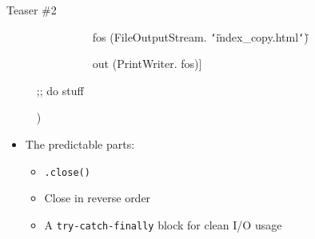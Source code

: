 \documentclass{beamer}
\renewcommand{\textquotedbl}{\texttt{\char`\"}}
\begin{document}
\begin{frame}[allowframebreaks]{Teaser \#2}
\begin{itemize}
\begin{small}
{\ttfamily\color{black}
\ \ \ \ \ \ \ \ \ \ \ \ fos
\textcolor[rgb]{0.54901963,0.54901963,0.54901963}{(}\textcolor[rgb]{0.28235295,0.23921569,0.54509807}{FileOutputStream.}
\textcolor[rgb]{0.54509807,0.13333334,0.32156864}{{\textquotedbl}index\_copy.html{\textquotedbl}}\textcolor[rgb]{0.54901963,0.54901963,0.54901963}{)}}

{\ttfamily\color{black}
\ \ \ \ \ \ \ \ \ \ \ \ out
\textcolor[rgb]{0.54901963,0.54901963,0.54901963}{(}\textcolor[rgb]{0.28235295,0.23921569,0.54509807}{PrintWriter.}
fos\textcolor[rgb]{0.54901963,0.54901963,0.54901963}{)}]}

{\ttfamily\color{black}
\ \ \textcolor[rgb]{0.69803923,0.13333334,0.13333334}{;; do stuff}}

{\ttfamily\color{black}
\ \ \textcolor[rgb]{0.54901963,0.54901963,0.54901963}{)}}
\end{small}
  \item The predictable parts:
    \begin{itemize}
      \item \texttt{.close()}
      \item Close in reverse order
      \item A \texttt{try-catch-finally} block for clean I/O usage
    \end{itemize}
  \end{itemize}
\end{frame}
\end{document}
